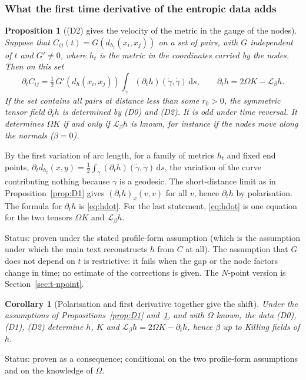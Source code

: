 \documentclass[11pt,a4paper]{article}
\makeatletter
\theoremstyle{stmt}
\newtheorem{proposition}[theorem]{Proposition}
\newtheorem{corollary}[theorem]{Corollary}
\theoremstyle{defn}
\theoremstyle{rmk}
\renewenvironment{proof}[1][\proofname]{\par\pushQED{\qed}\normalfont\topsep6\p@\@plus6\p@\relax
  \trivlist\item[\hskip\labelsep{\sffamily\itshape\small #1.}]\ignorespaces}{\popQED\endtrivlist\@endpefalse}
\numberwithin{equation}{section}
\newcommand{\Lie}{\mathcal{L}}
\newcommand{\status}[1]{\par\noindent\textsf{\small Status: #1}\par}
\newcommand{\dd}{\mathrm{d}}
\makeatother
\begin{document}
{\subsubsection{What the first time derivative of the entropic data adds}

\begin{proposition}[\textup{(D2)} gives the velocity of the metric in the gauge of the nodes]\label{prop:D2}
Suppose that $C_{ij}(t)=G(d_{h_t}(x_i,x_j))$ on a set of pairs, with $G$ independent of $t$ and $G'\ne0$, where $h_t$ is the metric in the coordinates carried by the nodes. Then on this set
\begin{equation}\label{eq:Cdot}
\partial_tC_{ij}=\tfrac12\,G'(d_h(x_i,x_j))\int_\gamma(\partial_th)(\dot\gamma,\dot\gamma)\,\dd s,\qquad\partial_th=2\Omega K-\Lie_\beta h .
\end{equation}
If the set contains all pairs at distance less than some $r_0>0$, the symmetric tensor field $\partial_th$ is determined by \textup{(D0)} and \textup{(D2)}. It is odd under time reversal. It determines $\Omega K$ if and only if $\Lie_\beta h$ is known, for instance if the nodes move along the normals ($\beta=0$).
\end{proposition}

\begin{proof}
By the first variation of arc length, for a family of metrics $h_t$ and fixed end points, $\partial_td_{h_t}(x,y)=\tfrac12\int_\gamma(\partial_th)(\dot\gamma,\dot\gamma)\,\dd s$, the variation of the curve contributing nothing because $\gamma$ is a geodesic. The short-distance limit as in Proposition~\ref{prop:D1} gives $(\partial_th)_x(v,v)$ for all $v$, hence $\partial_th$ by polarisation. The formula for $\partial_th$ is \eqref{eq:hdot}. For the last statement, \eqref{eq:hdot} is one equation for the two tensors $\Omega K$ and $\Lie_\beta h$.
\end{proof}
\status{proven under the stated profile-form assumption (which is the assumption under which the main text reconstructs $h$ from $C$ at all). The assumption that $G$ does not depend on $t$ is restrictive: it fails when the gap or the node factors change in time; no estimate of the corrections is given. The $N$-point version is Section~\ref{sec:t-npoint}.}

\begin{corollary}[Polarisation and first derivative together give the shift]\label{cor:shift}
Under the assumptions of Propositions~\ref{prop:D1} and~\ref{prop:D2}, and with $\Omega$ known, the data \textup{(D0)}, \textup{(D1)}, \textup{(D2)} determine $h$, $K$ and $\Lie_\beta h=2\Omega K-\partial_th$, hence $\beta$ up to Killing fields of $h$.
\end{corollary}
\status{proven as a consequence; conditional on the two profile-form assumptions and on the knowledge of $\Omega$.}

}
\end{document}
